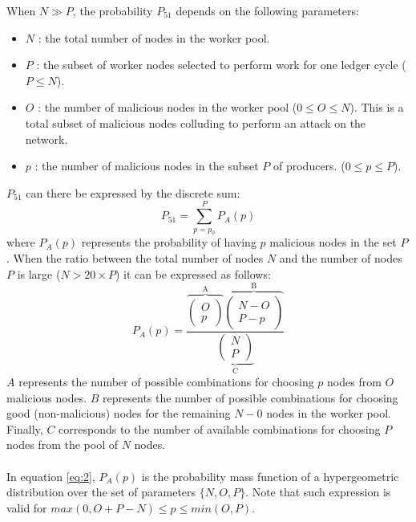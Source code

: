 When $N \gg P$, the probability $P_{51}$ depends on the following parameters:
\begin{itemize}
\item $N$ : the total number of nodes in the worker pool. 
\item $P$ : the subset of worker nodes selected to perform work for one ledger cycle ($P \leq N$).
\item $O$ : the number of malicious nodes in the worker pool ($0 \leq O \leq N$). This is a total subset of malicious nodes colluding to perform an attack on the network.
\item $p$ : the number of malicious nodes in the subset $P$ of producers. ($0 \leq p \leq P$).
\end{itemize}
$P_{51}$ can there be expressed by the discrete sum:
\begin{equation}
\label{eq:1}
P_{51} =  \sum_{p=p_0}^{P} P_{A}(p)
\end{equation}
where $P_{A}(p)$ represents the probability of having $p$ malicious nodes in the set $P$. When the ratio between the total number of nodes $N$ and the number of nodes $P$ is large ($N > 20\times P$) it can be expressed as follows: 
\begin{equation}
\label{eq:2}
P_{A}(p) = \frac{\overbrace{\left( \begin{array}{c} O \\
p \end{array} \right)}^\text{A} 
\overbrace{\left( \begin{array}{c} N - O \\ P - p \end{array} \right)}^\text{B}}{\underbrace{\left( \begin{array}{c} N \\
P \end{array} \right)}_\text{C}}
\end{equation}
$A$ represents the number of possible combinations for choosing $p$ nodes from $O$ malicious nodes. $B$ represents the number of possible combinations for choosing good (non-malicious) nodes for the remaining $N-0$ nodes in the worker pool. Finally, $C$ corresponds to the number of available combinations for choosing $P$ nodes from the pool of $N$ nodes.\\
\\
In equation \ref{eq:2}, $P_A(p)$ is the probability mass function of a hypergeometric distribution over the set of parameters $\{N,O,P\}$. Note that such expression is valid for $max(0,O+P-N) \leq p \leq min(O,P)$. \\

